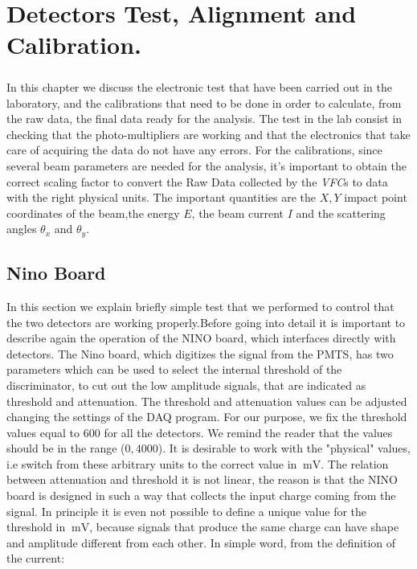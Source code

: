 \chapter{Detectors Test, Alignment and Calibration.} \label{analysis}

\paragraph{}
In this chapter we discuss the electronic test that have been carried out in the laboratory, and the calibrations that need to be done
in order to calculate, from the raw data, the final data ready for the analysis.
The test in the lab consist in checking that the photo-multipliers are working and that the electronics that take care of acquiring the data do not have any errors.
For the calibrations, since several beam parameters are needed for the analysis, it's important to obtain the correct scaling factor to convert the Raw Data collected by the \textit{VFC}s to data with the right physical units. The important quantities are the $X,Y$ impact point coordinates of the beam,the energy $E$, the beam current $I$ and the scattering angles $\theta_{x}$ and $\theta_{y}$.



\section{Nino Board}
In this section we explain briefly simple test that we performed to control that the two detectors are working properly.Before going into detail it is important to describe again the operation of the NINO board, which interfaces directly with detectors.
The Nino board, which digitizes the signal from the PMTS, has two parameters which can be used to select the internal threshold of the discriminator, to cut out the low amplitude signals, that are indicated as threshold and attenuation. The threshold and attenuation values can be adjusted changing the settings of the DAQ program.
For our purpose, we fix the threshold values equal to $600$ for all the detectors. We remind the reader that the values should be in the range ($0,4000$). 
It is desirable to work with the "physical" values, i.e switch from these arbitrary units to the correct value in $\SI{}{\milli \volt}$. The relation between attenuation and threshold it is not linear, the reason is that the NINO board is designed in such a way that collects the input charge coming from the signal. In principle it is even not possible to define a unique value for the threshold in $\SI{}{\milli \volt}$, because signals that produce the same charge can have shape and amplitude different from each other. In simple word, from the definition of the current:

